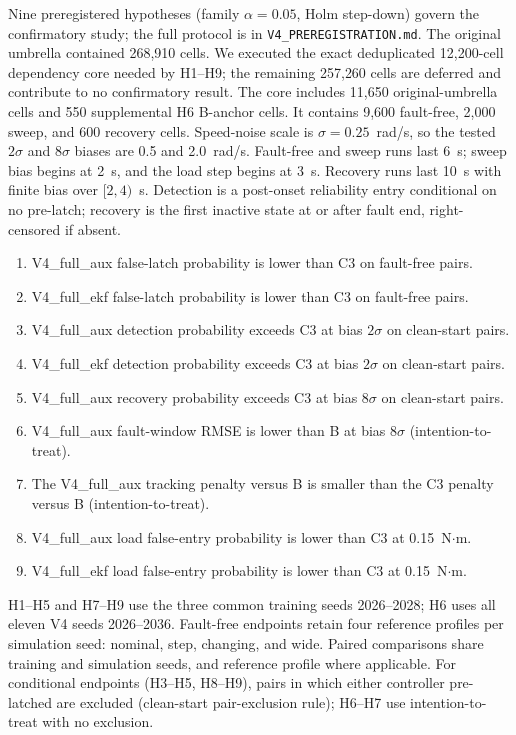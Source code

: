 \documentclass[conference]{IEEEtran}
\begin{document}
Nine preregistered hypotheses (family $\alpha=0.05$, Holm step-down)
govern the confirmatory study; the full protocol is in
\texttt{V4\_PREREGISTRATION.md}. The original umbrella contained 268{,}910
cells. We executed the exact deduplicated 12{,}200-cell dependency core
needed by H1--H9; the remaining 257{,}260 cells are deferred and contribute
to no confirmatory result. The core includes 11{,}650 original-umbrella
cells and 550 supplemental H6 B-anchor cells. It contains 9{,}600 fault-free, 2{,}000
sweep, and 600 recovery cells.
Speed-noise scale is $\sigma=0.25$~rad/s, so the tested $2\sigma$ and
$8\sigma$ biases are 0.5 and 2.0~rad/s. Fault-free and sweep runs last
6~s; sweep bias begins at 2~s, and the load step begins at 3~s.
Recovery runs last 10~s with finite bias over $[2,4)$~s. Detection is a
post-onset reliability entry conditional on no pre-latch; recovery is the
first inactive state at or after fault end, right-censored if absent.
\begin{enumerate}
\item[H1.] V4\_full\_aux false-latch probability is lower than C3 on
fault-free pairs.
\item[H2.] V4\_full\_ekf false-latch probability is lower than C3 on
fault-free pairs.
\item[H3.] V4\_full\_aux detection probability exceeds C3 at bias $2\sigma$
on clean-start pairs.
\item[H4.] V4\_full\_ekf detection probability exceeds C3 at bias $2\sigma$
on clean-start pairs.
\item[H5.] V4\_full\_aux recovery probability exceeds C3 at bias $8\sigma$
on clean-start pairs.
\item[H6.] V4\_full\_aux fault-window RMSE is lower than B at bias $8\sigma$
(intention-to-treat).
\item[H7.] The V4\_full\_aux tracking penalty versus B is smaller than the
C3 penalty versus B (intention-to-treat).
\item[H8.] V4\_full\_aux load false-entry probability is lower than C3 at
0.15~N$\cdot$m.
\item[H9.] V4\_full\_ekf load false-entry probability is lower than C3 at
0.15~N$\cdot$m.
\end{enumerate}
H1--H5 and H7--H9 use the three common training seeds 2026--2028;
H6 uses all eleven V4 seeds 2026--2036. Fault-free endpoints retain four
reference profiles per simulation seed: nominal, step, changing, and wide.
Paired comparisons share training and simulation seeds, and reference
profile where applicable.
For conditional endpoints (H3--H5, H8--H9), pairs in which either controller
pre-latched are excluded (clean-start pair-exclusion rule); H6--H7 use
intention-to-treat with no exclusion.
\end{document}
